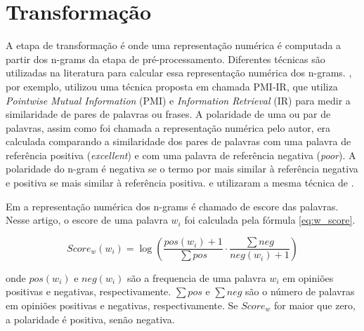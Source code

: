 \documentclass[template.tex]{subfiles}
\begin{document}
\section{Transformação}

%
%
%
%
%
%
%
%

A etapa de transformação é onde uma representação numérica é computada a partir dos n-grams da etapa de pré-processamento. Diferentes técnicas são utilizadas na literatura para calcular essa representação numérica dos n-grams. \cite{turney2002thumbs}, por exemplo, utilizou uma técnica proposta em \cite{turney2001mining} chamada PMI-IR, que utiliza \textit{Pointwise Mutual Information} (PMI) e \textit{Information Retrieval} (IR) para medir a similaridade de pares de palavras ou frases. A polaridade de uma ou par de palavras, assim como foi chamada a representação numérica pelo autor, era calculada comparando a similaridade dos pares de palavras com uma palavra de referência positiva  (\textit{excellent}) e com uma palavra de referência negativa (\textit{poor}). A polaridade do n-gram é negativa se o termo por mais similar à referência negativa e positiva se mais similar à referência positiva. \cite{wilson2005recognizing} e \cite{voll2007not} utilizaram a mesma técnica de \cite{turney2002thumbs}.

Em \cite{tsutsumi2007movie} a representação numérica dos n-grams é chamado de escore das palavras. Nesse artigo, o escore de uma palavra $w_i$ foi calculada pela fórmula \ref{eq:w_score}.

\begin{equation}
Score_w(w_i) = \log(\frac{pos(w_i) + 1}{\sum pos} \cdot \frac{\sum neg}{neg(w_i) + 1})
\label{eq:w_score}
\end{equation}

onde $pos(w_i)$ e $neg(w_i)$ são a frequencia de uma palavra $w_i$ em opiniões positivas e negativas, respectivamente. $\sum pos$ e $\sum neg$ são o número de palavras em opiniões positivas e negativas, respectivamente. Se $Score_w$ for maior que zero, a polaridade é positiva, senão negativa.
\end{document}
